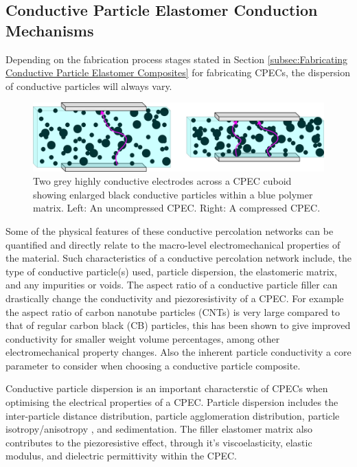 \subsection{Conductive Particle Elastomer Conduction Mechanisms}
Depending on the fabrication process stages stated in Section \ref{subsec:Fabricating Conductive Particle Elastomer Composites} for fabricating CPECs, the dispersion of conductive particles will always vary. 

\begin{figure}[H]
    \centering
    \includegraphics[width=0.7\linewidth]{Figures/res_deformed_states_x2_crop.jpg}
    \caption{Two grey highly conductive electrodes across a CPEC cuboid showing enlarged black conductive particles within a blue polymer matrix. Left: An uncompressed CPEC. Right: A compressed CPEC.}
    \label{fig:res_deformed_cube}
\end{figure}

Some of the physical features of these conductive percolation networks can be quantified and directly relate to the macro-level electromechanical properties of the material. Such characteristics of a conductive percolation network include, the type of conductive particle(s) used, particle dispersion, the elastomeric matrix, and any impurities or voids. The aspect ratio of a conductive particle filler can drastically change the conductivity and piezoresistivity of a CPEC. For example the aspect ratio of carbon nanotube particles (CNTs) is very large compared to that of regular carbon black (CB) particles, this has been shown to give improved conductivity for smaller weight volume percentages\cite{Wu2019,Flandin1999}, among other electromechanical property changes. Also the inherent particle conductivity a core parameter to consider when choosing a conductive particle composite.

Conductive particle dispersion is an important characterstic of CPECs when optimising the electrical properties of a CPEC. Particle dispersion includes the inter-particle distance distribution\cite{Kim2012}, particle agglomeration distribution\cite{Pegel2008}, particle isotropy/anisotropy \cite{Song2022}, and sedimentation\cite{Eklund2019}. The filler elastomer matrix also contributes to the piezoresistive effect, through it's viscoelasticity, elastic modulus, and dielectric permittivity within the CPEC.

